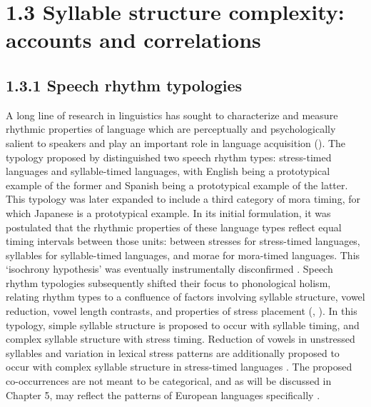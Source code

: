 \section{1.3 Syllable structure complexity: accounts and correlations}
\subsection{1.3.1 Speech rhythm typologies}

  A long line of research in linguistics has sought to characterize and measure rhythmic properties of language which are perceptually and psychologically salient to speakers and play an important role in language acquisition (\citealt{CutlerMehler1993}). The typology proposed by \citet{Pike1945} distinguished two speech rhythm types: stress-timed languages and syllable-timed languages, with English being a prototypical example of the former and Spanish being a prototypical example of the latter. This typology was later expanded to include a third category of mora timing, for which Japanese is a prototypical example. In its initial formulation, it was postulated that the rhythmic properties of these language types reflect equal timing intervals between those units: between stresses for stress-timed languages, syllables for syllable-timed languages, and morae for mora-timed languages. This ‘isochrony hypothesis’ was eventually instrumentally disconfirmed \citep{Roach1982}. Speech rhythm typologies subsequently shifted their  focus to phonological holism, relating rhythm types to a confluence of factors involving syllable structure, vowel reduction, vowel length contrasts, and properties of stress placement (\citealt{Roach1982}, \citealt{Dauer1983}). In this typology, simple syllable structure is proposed to occur with syllable timing, and complex syllable structure with stress timing. Reduction of vowels in unstressed syllables and variation in lexical stress patterns are additionally proposed to occur with complex syllable structure in stress-timed languages \citep{Auer1993}. The proposed co-occurrences are not meant to be categorical, and as will be discussed in Chapter 5, may reflect the patterns of European languages specifically \citep{Schiering2007}.

